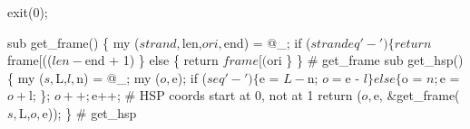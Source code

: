 \documentclass[11pt]{article}
\def\nwendcode{\endtrivlist \endgroup} %
\let\nwdocspar=\par                    %
\begin{document}
exit(0);
\nwendcode{}\nwdocspar

\nwenddocs{}\endmoddef
sub get_frame() \{
    my ($strand,$len,$ori,$end) = @_;
    if ($strand eq '-') \{
       return $frame[(($len - $end + 1) %
    \} else \{
       return $frame[($ori %
    \}
\} # get_frame
sub get_hsp() \{
    my ($s,$L,$l,$n) = @_;
    my ($o,$e);
    if ($s eq '-') \{
        $e = $L - $n;
        $o = $e - $l
    \} else \{
        $o = $n;
        $e = $o + $l;
    \};
    $o++; $e++; # HSP coords start at 0, not at 1
    return ($o, $e, &get_frame($s,$L,$o,$e));
\} # get_hsp
\nwendcode{}\nwdocspar
\end{document}
